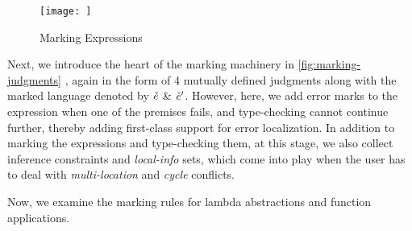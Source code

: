 \begin{figure}
    \judgbox{\synMarkConstraint{\ctx}{\EMV}{\ECMV}{\sigma}{\cConstraint}{\mConstraint}} 
    \judgbox{\synMarkConstraint{\ctx}{\ELV}{\ELMV}{\sigma}{\cConstraint}{\mConstraint}} 
    \judgbox{\anaMarkConstraint{\ctx}{\EMV}{\ECMV}{\sigma}{\cConstraint}{\mConstraint}} 
    \judgbox{\anaMarkConstraint{\ctx}{\ELV}{\ELMV}{\sigma}{\cConstraint}{\mConstraint}} 
    \centering
    \texttt{[image: ]}
    \caption{Marking Expressions}
    \label{fig:marking-judgments}
\end{figure}


Next, we introduce the heart of the marking machinery in \autoref{fig:marking-judgments} , again in the form of 4 mutually defined judgments along with the marked language denoted by $\check{e}$ \& $\check{e}'$. However, here, we add error marks to the expression when one of the premises fails, and type-checking cannot continue further, thereby adding first-class support for error localization. In addition to marking the expressions and type-checking them, at this stage, we also collect inference constraints and \emph{local-info} sets, which come into play when the user has to deal with \emph{multi-location} and \emph{cycle} conflicts.

Now, we examine the marking rules for lambda abstractions and function applications. 

